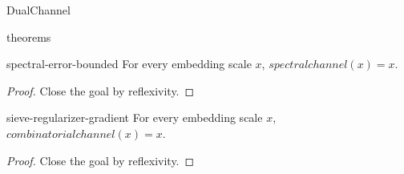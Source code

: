 \begin{lexlean}{DualChannel}
\begin{section}{theorems}
  \begin{theorem}{spectral-error-bounded}
  \noaxioms
  For every embedding scale \(x\), \(spectralchannel(x) = x\).
  \begin{proof}
  Close the goal by reflexivity.
  \end{proof}
  \end{theorem}

  \begin{theorem}{sieve-regularizer-gradient}
  \noaxioms
  For every embedding scale \(x\), \(combinatorialchannel(x) = x\).
  \begin{proof}
  Close the goal by reflexivity.
  \end{proof}
  \end{theorem}
\end{section}
\end{lexlean}
